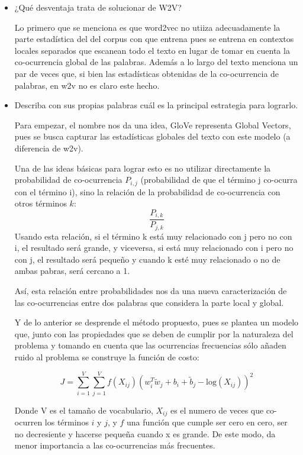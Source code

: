 \documentclass[letter, 11pt, twoside]{report}
\begin{document}
\begin{itemize}
  \item ¿Qué desventaja trata de solucionar de W2V?
  
  Lo primero que se menciona es que word2vec no utiiza adecuadamente la parte estadística del del corpus con que entrena pues se entrena en contextos locales separados que escanean todo el texto en lugar de tomar en cuenta la co-ocurrencia global de las palabras. 
  Además a lo largo del texto menciona un par de veces que, si bien las estadísticas obtenidas de la co-ocurrencia de palabras, en w2v no es claro este hecho. 

  \item Describa con sus propias palabras cuál es la principal estrategia para lograrlo.
  
  Para empezar, el nombre nos da una idea, GloVe representa Global Vectors, pues se busca capturar las estadísticas globales del texto con este modelo (a diferencia de w2v).

  Una de las ideas básicas para lograr esto es no utilizar directamente la probabilidad de co-ocurrencia $P_{i,j}$ (probabilidad de que el término j co-ocurra con el término i), sino la relación de la probabilidad de co-ocurrencia con otros términos $k$:  $$\frac{P_{i,k}}{P_{j,k}}$$
  Usando esta relación, si el término k está muy relacionado con j pero no con i, el resultado será grande, y viceversa, si está muy relacionado con i pero no con j, el resultado será pequeño y cuando k esté muy relacionado o no de ambas pabras, será cercano a 1.

  Así, esta relación entre probabilidades nos da una nueva caracterización de las co-ocurrencias entre dos palabras que considera la parte local y global. 

  Y de lo anterior se desprende el método propuesto, pues se plantea un modelo que, junto con las propiedades que se deben de cumplir por la naturaleza del problema y tomando en cuenta que las ocurrencias frecuencias sólo añaden ruido al problema se construye la función de costo:

  \begin{equation}
    J = \sum_{i=1}^{V} \sum_{j=1}^{V} f(X_{ij}) \left( w_i^T \tilde{w}_j + b_i + \tilde{b}_j - \text{log}(X_{ij}) \right)^2
    \end{equation}

    Donde V es el tamaño de vocabulario, $X_{ij}$ es el numero de veces que co-ocurren los términos $i$ y $j$, y $f$ una función que cumple ser cero en cero, ser no decresiente y hacerse pequeña cuando x es grande. De este modo, da menor importancia a las  co-ocurrencias más frecuentes.


\end{itemize}
\end{document}
